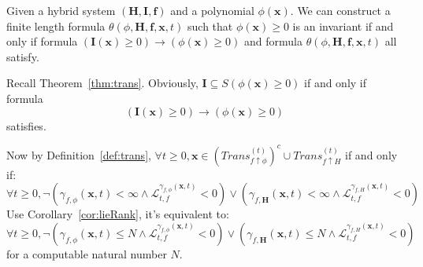 \documentclass{jssc}
\begin{document}
\begin{theorem}
\label{thm:translate}
Given a hybrid system $(\boldsymbol{H}, \boldsymbol{I}, \boldsymbol{f})$ and a polynomial $\phi(\boldsymbol{x})$. We can construct a finite length formula $\theta(\phi ,\boldsymbol{H}, \boldsymbol{f}, \boldsymbol{x}, t)$ such that $\phi(\boldsymbol{x}) \geq 0$ is an invariant if and only if formula
		$(\boldsymbol{I}(\boldsymbol{x}) \geq 0) \rightarrow (\phi(\boldsymbol{x}) \geq 0)$
and formula
		$\theta(\phi ,\boldsymbol{H}, \boldsymbol{f}, \boldsymbol{x}, t)$
all satisfy.
\end{theorem}

\proof
Recall Theorem~\ref{thm:trans}. Obviously, $\boldsymbol{I} \subseteq S(\phi(\boldsymbol{x}) \geq 0)$ if and only if formula
	\begin{equation*}
		(\boldsymbol{I}(\boldsymbol{x}) \geq 0) \rightarrow (\phi(\boldsymbol{x}) \geq 0)
	\end{equation*}
satisfies.

Now by Definition~\ref{def:trans}, $\forall t \geq 0, \boldsymbol{x} \in (Trans_{f \uparrow \phi}^{(t)})^c \cup Trans_{f \uparrow H}^{(t)}$ if and only if:
	\begin{equation*}
		\forall t \geq 0, \neg(\gamma_{f, \phi}(\boldsymbol{x}, t) < \infty \wedge \mathcal{L}_{t, f}^{\gamma_{f, \phi}(\boldsymbol{x}, t)} < 0) \vee (\gamma_{f, \boldsymbol{H}}(\boldsymbol{x}, t) < \infty \wedge \mathcal{L}_{t, f}^{\gamma_{f, H}(\boldsymbol{x}, t)} <0)
	\end{equation*}
Use Corollary~\ref{cor:lieRank}, it's equivalent to:
	\begin{equation*}
		\forall t \geq 0, \neg(\gamma_{f, \phi}(\boldsymbol{x}, t) \leq N \wedge \mathcal{L}_{t, f}^{\gamma_{f, \phi}(\boldsymbol{x}, t)} < 0) \vee (\gamma_{f, \boldsymbol{H}}(\boldsymbol{x}, t) \leq N \wedge \mathcal{L}_{t, f}^{\gamma_{f, H}(\boldsymbol{x}, t)} <0)
	\end{equation*}
for a computable natural number $N$.
\end{document}
